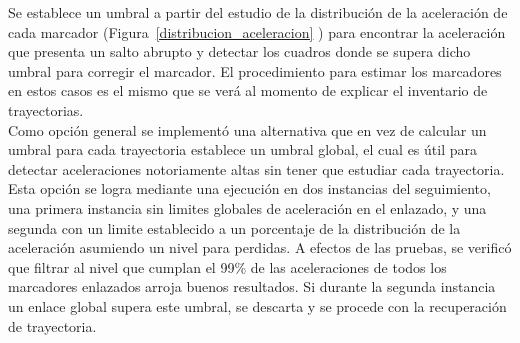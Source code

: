 \begin{itemize}
Se establece un umbral a partir del estudio de la distribución de la aceleración de cada marcador (Figura~\ref{distribucion_aceleracion} ) para encontrar la aceleración que presenta un salto abrupto y detectar los cuadros donde se supera dicho umbral para corregir el marcador. El procedimiento para estimar los marcadores en estos casos es el mismo que se verá al momento de explicar el inventario de trayectorias. 
\\ 

Como opción general se implementó una alternativa que en vez de calcular un umbral para cada trayectoria establece un umbral global, el cual es útil para detectar aceleraciones notoriamente altas sin tener que estudiar cada trayectoria. Esta opción se logra mediante una ejecución en dos instancias del seguimiento, una primera instancia sin limites globales de aceleración en el enlazado, y una segunda con un limite establecido a un porcentaje de la distribución de la aceleración asumiendo un nivel para perdidas. A efectos de las pruebas, se verificó que filtrar al nivel que cumplan el 99\% de las aceleraciones de todos los marcadores enlazados arroja buenos resultados. Si durante la segunda instancia un enlace global supera este umbral, se descarta y se procede con la recuperación de trayectoria.


\end{itemize}
